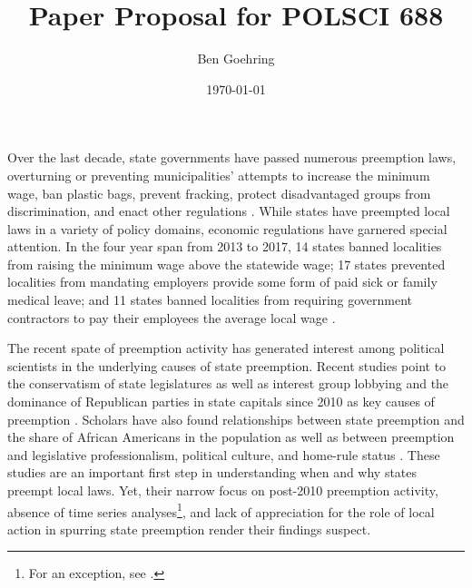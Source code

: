 \documentclass[12pt]{article}
\title{Paper Proposal for POLSCI 688}
\author{Ben Goehring}
\date{\today}
\begin{document}
\begin{titlepage}
\maketitle
\end{titlepage}

Over the last decade, state governments have passed numerous preemption laws, overturning or preventing municipalities' attempts to increase the minimum wage, ban plastic bags, prevent fracking, protect disadvantaged groups from discrimination, and enact other regulations \parencite{dupuisCityRightsEra2018,schraggerStatePreemptionLocal2017}. While states have preempted local laws in a variety of policy domains, economic regulations have garnered special attention. In the four year span from 2013 to 2017, 14 states banned localities from raising the minimum wage above the statewide wage; 17 states prevented localities from mandating employers provide some form of paid sick or family medical leave; and 11 states banned localities from requiring government contractors to pay their employees the average local wage \parencite{vonwilpertCityGovernmentsAre2017}.

The recent spate of preemption activity has generated interest among political scientists in the underlying causes of state preemption. Recent studies point to the conservatism of state legislatures \parencite{goodmanStateLegislativeIdeology2019} as well as interest group lobbying and the dominance of Republican parties in state capitals since 2010 as key causes of preemption \parencite{hicksHomeRuleBe2018,fowlerStatePreemptionLocal2019,flavinExplainingStatePreemption2019,riverstone-newellRiseStatePreemption2017}. Scholars have also found relationships between state preemption and the share of African Americans in the population \parencite{flavinExplainingStatePreemption2019} as well as between preemption and legislative professionalism, political culture, and home-rule status \parencite{fowlerStatePreemptionLocal2019}. These studies are an important first step in understanding when and why states preempt local laws. Yet, their narrow focus on post-2010 preemption activity, absence of time series analyses\footnote{For an exception, see \cite{goodmanStateLegislativeIdeology2019}.}, and lack of appreciation for the role of local action in spurring state preemption render their findings suspect.
\end{document}

